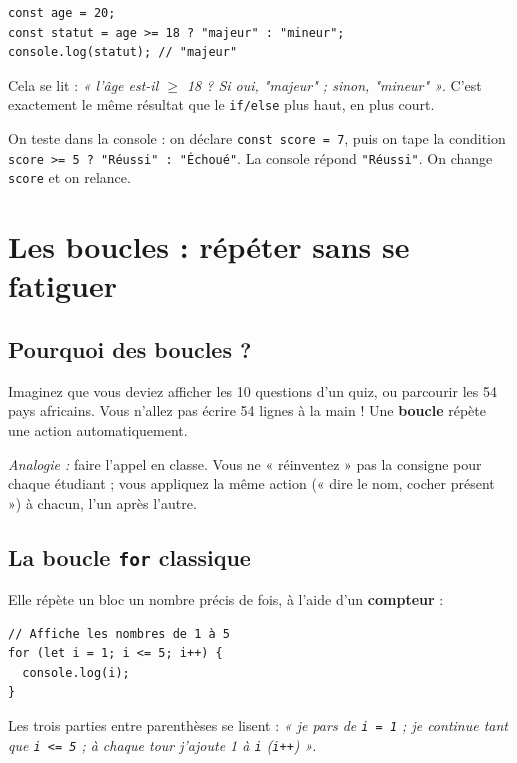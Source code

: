 \documentclass[11pt,a4paper]{article}
\newcommand{\code}[1]{\texttt{#1}}
\begin{document}
\begin{lstlisting}[style=js]
const age = 20;
const statut = age >= 18 ? "majeur" : "mineur";
console.log(statut); // "majeur"
\end{lstlisting}

Cela se lit : \emph{« l'âge est-il $\geq$ 18 ? Si oui, "majeur" ; sinon, "mineur" »}. C'est exactement le même résultat que le \code{if/else} plus haut, en plus court.

\begin{infobox}
On teste dans la console : on déclare \code{const score = 7}, puis on tape la condition \code{score >= 5 ? "Réussi" : "Échoué"}. La console répond \code{"Réussi"}. On change \code{score} et on relance.
\end{infobox}

\section{Les boucles : répéter sans se fatiguer}

\subsection{Pourquoi des boucles ?}

Imaginez que vous deviez afficher les 10 questions d'un quiz, ou parcourir les 54 pays africains. Vous n'allez pas écrire 54 lignes à la main ! Une \textbf{boucle} répète une action automatiquement.

\emph{Analogie :} faire l'appel en classe. Vous ne « réinventez » pas la consigne pour chaque étudiant ; vous appliquez la même action (« dire le nom, cocher présent ») à chacun, l'un après l'autre.

\subsection{La boucle \code{for} classique}

Elle répète un bloc un nombre précis de fois, à l'aide d'un \textbf{compteur} :

\begin{lstlisting}[style=js]
// Affiche les nombres de 1 à 5
for (let i = 1; i <= 5; i++) {
  console.log(i);
}
\end{lstlisting}

Les trois parties entre parenthèses se lisent : \emph{« je pars de \code{i = 1} ; je continue tant que \code{i <= 5} ; à chaque tour j'ajoute 1 à \code{i} (\code{i++}) »}.
\end{document}
